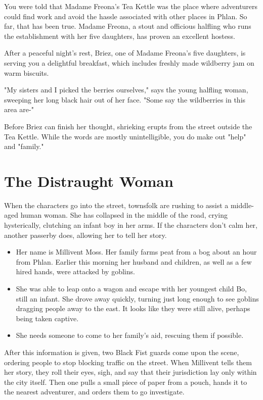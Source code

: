 \documentclass[10pt,a4paper,twoside,bg=print,twocolumn,openany,nodeprecatedcode]{dndbook}
\begin{document}
\begin{DndReadAloud}{}
You were told that Madame Freona's Tea Kettle was the place where adventurers could find work and avoid the hassle associated with other places in Phlan. So far, that has been true. Madame Freona, a stout and officious halfling who runs the establishment with her five daughters, has proven an excellent hostess.

After a peaceful night's rest, Briez, one of Madame Freona's five daughters, is serving you a delightful breakfast, which includes freshly made wildberry jam on warm biscuits.

"My sisters and I picked the berries ourselves," says the young halfling woman, sweeping her long black hair out of her face. "Some say the wildberries in this area are-"

Before Briez can finish her thought, shrieking erupts from the street outside the Tea Kettle. While the words are mostly unintelligible, you do make out "help" and "family."

\end{DndReadAloud}

\section{The Distraught Woman}
When the characters go into the street, townsfolk are rushing to assist a middle-aged human woman. She has collapsed in the middle of the road, crying hysterically, clutching an infant boy in her arms. If the characters don't calm her, another passerby does, allowing her to tell her story.


\begin{itemize}
\item Her name is Millivent Moss. Her family farms peat from a bog about an hour from Phlan. Earlier this morning her husband and children, as well as a few hired hands, were attacked by goblins.
\item She was able to leap onto a wagon and escape with her youngest child Bo, still an infant. She drove away quickly, turning just long enough to see goblins dragging people away to the east. It looks like they were still alive, perhaps being taken captive.
\item She needs someone to come to her family's aid, rescuing them if possible.
\end{itemize}

After this information is given, two Black Fist guards come upon the scene, ordering people to stop blocking traffic on the street. When Millivent tells them her story, they roll their eyes, sigh, and say that their jurisdiction lay only within the city itself. Then one pulls a small piece of paper from a pouch, hands it to the nearest adventurer, and orders them to go investigate.
\end{document}
